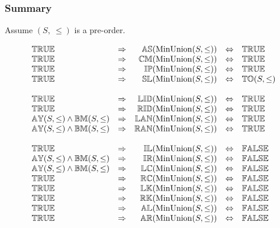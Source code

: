 \documentclass[../Summary.tex]{subfiles}
\begin{document}
\subsubsection{Summary}

Assume $(S,\ \leq)$ is a pre-order.

\[
\begin{array}{lcrcl} 
{\mathbb{TRUE}}
	& \Rightarrow
	& {\mathbb{AS}}(\mathrm{MinUnion}(S, \leq)) 
	& \Leftrightarrow 
	& {\mathbb{TRUE}} 
	\\ 
{\mathbb{TRUE}}
	& \Rightarrow
	& {\mathbb{CM}}(\mathrm{MinUnion}(S, \leq)) 
	& \Leftrightarrow 
  	& {\mathbb{TRUE}}
	\\ 
{\mathbb{TRUE}}
	& \Rightarrow
	& {\mathbb{IP}}(\mathrm{MinUnion}(S, \leq)) 
	& \Leftrightarrow 
	& {\mathbb{TRUE}}
	\\
{\mathbb{TRUE}}
	& \Rightarrow
	& {\mathbb{SL}}(\mathrm{MinUnion}(S, \leq)) 
	& \Leftrightarrow 
	& {\mathbb{TO}}(S, \leq)  
	\\\\
	
{\mathbb{TRUE}}
	& \Rightarrow
	& {\mathbb{LID}}(\mathrm{MinUnion}(S, \leq)) 
	& \Leftrightarrow 
	& {\mathbb{TRUE}}
	\\
{\mathbb{TRUE}}
	& \Rightarrow
	& {\mathbb{RID}}(\mathrm{MinUnion}(S, \leq)) 
	& \Leftrightarrow 
	& {\mathbb{TRUE}}
	\\
{\mathbb{AY}}(S, \leq) \wedge {\mathbb{BM}}(S, \leq)
	& \Rightarrow
	& {\mathbb{LAN}}(\mathrm{MinUnion}(S, \leq)) 
	& \Leftrightarrow 
	& {\mathbb{TRUE}}
	\\
{\mathbb{AY}}(S, \leq) \wedge {\mathbb{BM}}(S, \leq)
	& \Rightarrow
	& {\mathbb{RAN}}(\mathrm{MinUnion}(S, \leq)) 
	& \Leftrightarrow 
	& {\mathbb{TRUE}}
	\\\\
	
{\mathbb{TRUE}}
	& \Rightarrow
	& {\mathbb{IL}}(\mathrm{MinUnion}(S, \leq)) 
	& \Leftrightarrow
	& {\mathbb{FALSE}} 
	\\
{\mathbb{AY}}(S, \leq) \wedge {\mathbb{BM}}(S, \leq)
	& \Rightarrow
	& {\mathbb{IR}}(\mathrm{MinUnion}(S, \leq)) 
	& \Leftrightarrow
	& {\mathbb{FALSE}} 
	\\
{\mathbb{AY}}(S, \leq) \wedge {\mathbb{BM}}(S, \leq)
	& \Rightarrow
	& {\mathbb{LC}}(\mathrm{MinUnion}(S, \leq)) 
	& \Leftrightarrow
	& {\mathbb{FALSE}} 
	\\
{\mathbb{TRUE}}
	& \Rightarrow
	& {\mathbb{RC}}(\mathrm{MinUnion}(S, \leq)) 
	& \Leftrightarrow
	& {\mathbb{FALSE}} 
	\\
{\mathbb{TRUE}}
	& \Rightarrow
	& {\mathbb{LK}}(\mathrm{MinUnion}(S, \leq)) 
	& \Leftrightarrow
	& {\mathbb{FALSE}} 
	\\
{\mathbb{TRUE}}
	& \Rightarrow
	& {\mathbb{RK}}(\mathrm{MinUnion}(S, \leq)) 
	& \Leftrightarrow
	& {\mathbb{FALSE}} 
	\\
{\mathbb{TRUE}}
	& \Rightarrow
	& {\mathbb{AL}}(\mathrm{MinUnion}(S, \leq))  
	& \Leftrightarrow
	& {\mathbb{FALSE}} 
	\\
{\mathbb{TRUE}}
	& \Rightarrow
	& {\mathbb{AR}}(\mathrm{MinUnion}(S, \leq))  
	& \Leftrightarrow
	& {\mathbb{FALSE}} 
	\\
\end{array} 
\] 
\end{document}
